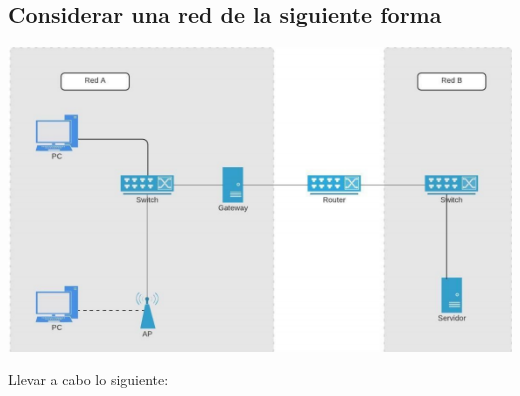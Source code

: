 \documentclass[spanish,12pt,letterpaper]{article}
\begin{document}
\subsection{Considerar una red de la siguiente forma}
\begin{center}
  \includegraphics[scale=.75]{red.png}
\end{center}
Llevar a cabo lo siguiente:
\end{document}
